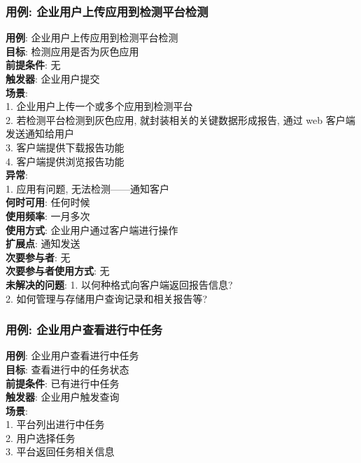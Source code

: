 \documentclass[UTF8]{article}
\begin{document}
\subsubsection{用例: 企业用户上传应用到检测平台检测}
\noindent
\textbf{用例}: 企业用户上传应用到检测平台检测
\\
\textbf{目标}: 检测应用是否为灰色应用
\\
\textbf{前提条件}: 无
\\
\textbf{触发器}: 企业用户提交
\\
\textbf{场景}: \\
	\hspace*{2em} 1. 企业用户上传一个或多个应用到检测平台 \\
	\hspace*{2em} 2. 若检测平台检测到灰色应用, 就封装相关的关键数据形成报告, 通过 web 客户端发送通知给用户 \\
	\hspace*{2em} 3. 客户端提供下载报告功能 \\
	\hspace*{2em} 4. 客户端提供浏览报告功能 \\
\textbf{异常}: \\
	\hspace*{2em} 1. 应用有问题, 无法检测——通知客户 \\
\textbf{何时可用}: 任何时候
\\
\textbf{使用频率}: 一月多次
\\
\textbf{使用方式}: 企业用户通过客户端进行操作 \\
\textbf{扩展点}: 通知发送
\\
\textbf{次要参与者}: 无
\\
\textbf{次要参与者使用方式}: 无
\\
\textbf{未解决的问题}: 
	\hspace*{2em} 1. 以何种格式向客户端返回报告信息? \\
	\hspace*{2em} 2. 如何管理与存储用户查询记录和相关报告等? \\
	
\subsubsection{用例: 企业用户查看进行中任务}
\noindent
\textbf{用例}: 企业用户查看进行中任务
\\
\textbf{目标}: 查看进行中的任务状态
\\
\textbf{前提条件}: 已有进行中任务
\\
\textbf{触发器}: 企业用户触发查询
\\
\textbf{场景}: \\
	\hspace*{2em} 1. 平台列出进行中任务 \\
	\hspace*{2em} 2. 用户选择任务 \\
	\hspace*{2em} 3. 平台返回任务相关信息 \\
	
\end{document}
